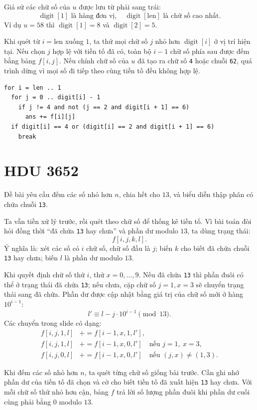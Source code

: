 \documentclass[11pt]{article}
\begin{document}
Giả sử các chữ số của $u$ được lưu từ phải sang trái:
\[
  \operatorname{digit}[1]\text{ là hàng đơn vị},\quad
  \operatorname{digit}[\mathrm{len}]\text{ là chữ số cao nhất}.
\]
Ví dụ $u=58$ thì $\operatorname{digit}[1]=8$ và
$\operatorname{digit}[2]=5$.

Khi quét từ $i=\mathrm{len}$ xuống $1$, ta thử mọi chữ số $j$ nhỏ hơn
$\operatorname{digit}[i]$ ở vị trí hiện tại. Nếu chọn $j$ hợp lệ với tiền tố
đã có, toàn bộ $i-1$ chữ số phía sau được đếm bằng bảng $f[i,j]$. Nếu chính
chữ số của $u$ đã tạo ra chữ số \texttt{4} hoặc chuỗi \texttt{62}, quá trình
dừng vì mọi số đi tiếp theo cùng tiền tố đều không hợp lệ.

\begin{verbatim}
for i = len .. 1
  for j = 0 .. digit[i] - 1
    if j != 4 and not (j == 2 and digit[i + 1] == 6)
      ans += f[i][j]
  if digit[i] == 4 or (digit[i] == 2 and digit[i + 1] == 6)
    break
\end{verbatim}

\section{HDU 3652}

Đề bài yêu cầu đếm các số nhỏ hơn $n$, chia hết cho $13$, và biểu diễn thập
phân có chứa chuỗi \texttt{13}.

Ta vẫn tiền xử lý trước, rồi quét theo chữ số để thống kê tiền tố. Vì bài toán
đòi hỏi đồng thời ``đã chứa \texttt{13} hay chưa'' và phần dư modulo $13$, ta
dùng trạng thái:
\[
  f[i,j,k,l].
\]
Ý nghĩa là: xét các số có $i$ chữ số, chữ số đầu là $j$; biến $k$ cho biết
đã chứa chuỗi \texttt{13} hay chưa; biến $l$ là phần dư modulo $13$.

Khi quyết định chữ số thứ $i$, thử $x=0,\ldots,9$. Nếu đã chứa \texttt{13}
thì phần đuôi có thể ở trạng thái đã chứa \texttt{13}; nếu chưa, cặp chữ số
$j=1,x=3$ sẽ chuyển trạng thái sang đã chứa. Phần dư được cập nhật bằng giá
trị của chữ số mới ở hàng $10^{i-1}$:
\[
  l' \equiv l-j\cdot 10^{i-1}\pmod{13}.
\]
Các chuyển trong slide có dạng:
\begin{align*}
  f[i,j,1,l] &\mathrel{+}= f[i-1,x,1,l'],\\
  f[i,j,1,l] &\mathrel{+}= f[i-1,x,0,l']
    \quad\text{nếu }j=1,\ x=3,\\
  f[i,j,0,l] &\mathrel{+}= f[i-1,x,0,l']
    \quad\text{nếu }(j,x)\ne(1,3).
\end{align*}

Khi đếm các số nhỏ hơn $n$, ta quét từng chữ số giống bài trước. Cần ghi nhớ
phần dư của tiền tố đã chọn và cờ cho biết tiền tố đã xuất hiện \texttt{13}
hay chưa. Với mỗi chữ số thử nhỏ hơn cận, bảng $f$ trả lời số lượng phần đuôi
khi phần dư cuối cùng phải bằng $0$ modulo $13$.
\end{document}
